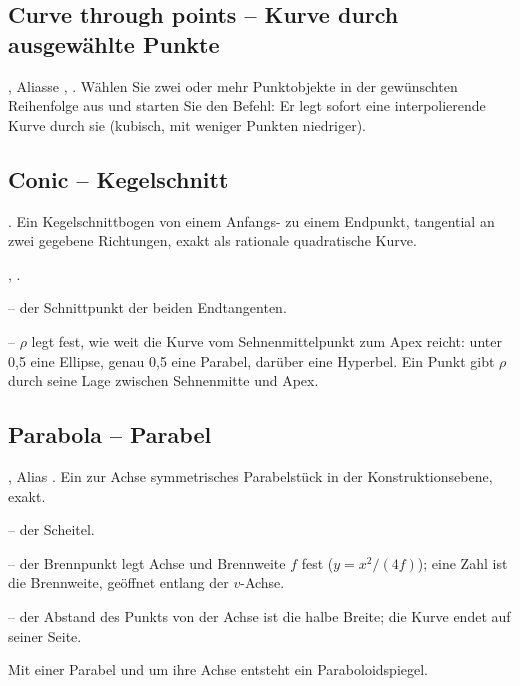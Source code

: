 \subsection{Curve through points -- Kurve durch ausgewählte Punkte}\label{sec:cmd-crvpts}
, Aliasse , . Wählen Sie
zwei oder mehr Punktobjekte in der gewünschten Reihenfolge aus und starten Sie den Befehl: Er
legt sofort eine interpolierende Kurve durch sie (kubisch, mit weniger Punkten niedriger).

\subsection{Conic -- Kegelschnitt}\label{sec:cmd-conic}
. Ein Kegelschnittbogen von einem Anfangs- zu einem Endpunkt, tangential an zwei
gegebene Richtungen, exakt als rationale quadratische Kurve.
\begin{schritte}
\item {}, .
\item {} -- der Schnittpunkt der beiden
  Endtangenten.
\item {} -- $\rho$ legt
  fest, wie weit die Kurve vom Sehnenmittelpunkt zum Apex reicht: unter 0,5 eine Ellipse, genau
  0,5 eine Parabel, darüber eine Hyperbel. Ein Punkt gibt $\rho$ durch seine Lage zwischen
  Sehnenmitte und Apex.
\end{schritte}

\subsection{Parabola -- Parabel}\label{sec:cmd-parabola}
, Alias . Ein zur Achse symmetrisches Parabelstück in der
Konstruktionsebene, exakt.
\begin{schritte}
\item {} -- der Scheitel.
\item {} -- der Brennpunkt legt Achse und Brennweite $f$
  fest ($y = x^2/(4f)$); eine Zahl ist die Brennweite, geöffnet entlang der $v$-Achse.
\item {} -- der Abstand des Punkts von der Achse ist die
  halbe Breite; die Kurve endet auf seiner Seite.
\end{schritte}
Mit einer Parabel und  um ihre Achse entsteht ein Paraboloidspiegel.

